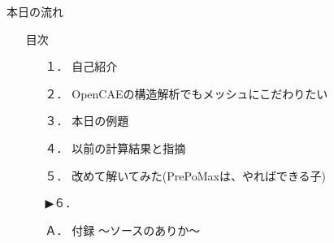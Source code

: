 \begin{frame}{本日の流れ}
  \begin{itemize}
      \item[] 目次
    \begin{enumerate}[label=\textbf{ \arabic*.},itemsep=1.3ex, leftmargin=1cm]
        \item[１．] 自己紹介
        \item[２．] OpenCAEの構造解析でもメッシュにこだわりたい
        \item[３．] 本日の例題
        \item[４．] 以前の計算結果と指摘
        \item[５．] 改めて解いてみた(PrePoMaxは、やればできる子) 
        \item[▶６．] 
        \item[Ａ．] 付録 ～ソースのありか～
    \end{enumerate}
  \end{itemize}
\end{frame}
